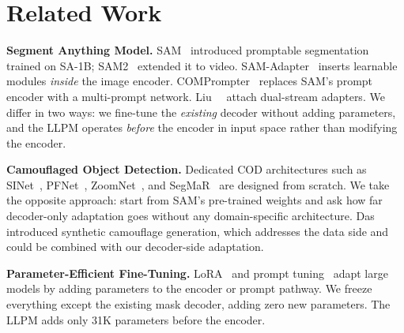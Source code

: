 \section{Related Work}

\noindent\textbf{Segment Anything Model.}
SAM~\cite{kirillov2023sam} introduced promptable segmentation trained on SA-1B; SAM2~\cite{ravi2024sam2} extended it to video. SAM-Adapter~\cite{chen2023samadapter} inserts learnable modules \emph{inside} the image encoder. COMPrompter~\cite{hao2024comprompter} replaces SAM's prompt encoder with a multi-prompt network. Liu~\etal~\cite{liu2025dualstream} attach dual-stream adapters. We differ in two ways: we fine-tune the \emph{existing} decoder without adding parameters, and the LLPM operates \emph{before} the encoder in input space rather than modifying the encoder.

\noindent\textbf{Camouflaged Object Detection.}
Dedicated COD architectures such as SINet~\cite{fan2020cod10k}, PFNet~\cite{mei2021pfnet}, ZoomNet~\cite{pang2022zoomnet}, and SegMaR~\cite{jia2022segmar} are designed from scratch. We take the opposite approach: start from SAM's pre-trained weights and ask how far decoder-only adaptation goes without any domain-specific architecture. Das~\etal~\cite{das2025camouflage} introduced synthetic camouflage generation, which addresses the data side and could be combined with our decoder-side adaptation.

\noindent\textbf{Parameter-Efficient Fine-Tuning.}
LoRA~\cite{hu2022lora} and prompt tuning~\cite{lester2021prompt} adapt large models by adding parameters to the encoder or prompt pathway. We freeze everything except the existing mask decoder, adding zero new parameters. The LLPM adds only 31K parameters before the encoder.

